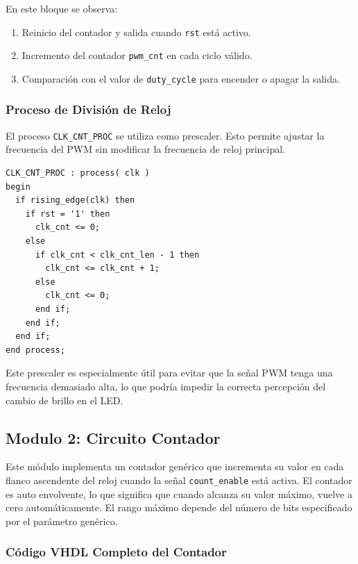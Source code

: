 \documentclass[a4paper,12pt]{article}
\begin{document}
En este bloque se observa:
\begin{enumerate}
    \item Reinicio del contador y salida cuando \texttt{rst} está activo.
    \item Incremento del contador \texttt{pwm\_cnt} en cada ciclo válido.
    \item Comparación con el valor de \texttt{duty\_cycle} para encender o apagar la salida.
\end{enumerate}

\subsubsection*{Proceso de División de Reloj}

El proceso \texttt{CLK\_CNT\_PROC} se utiliza como prescaler. Esto permite ajustar la frecuencia del PWM sin modificar la frecuencia de reloj principal.


\begin{lstlisting}[caption={Proceso de división de reloj}, label={lst:clk_cnt_proc}]
CLK_CNT_PROC : process( clk )
begin
  if rising_edge(clk) then
    if rst = '1' then
      clk_cnt <= 0;
    else
      if clk_cnt < clk_cnt_len - 1 then
        clk_cnt <= clk_cnt + 1;
      else
        clk_cnt <= 0;
      end if;
    end if;
  end if;
end process;
\end{lstlisting}

Este prescaler es especialmente útil para evitar que la señal PWM tenga una frecuencia demasiado alta, lo que podría impedir la correcta percepción del cambio de brillo en el LED.


\subsection{Modulo 2: Circuito Contador}

Este módulo implementa un contador genérico que incrementa su valor en cada flanco ascendente del reloj cuando la señal \texttt{count\_enable} está activa. El contador es auto envolvente, lo que significa que cuando alcanza su valor máximo, vuelve a cero automáticamente. El rango máximo depende del número de bits especificado por el parámetro genérico.

\subsubsection{Código VHDL Completo del Contador}
\end{document}

